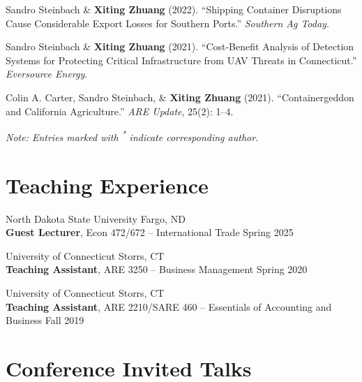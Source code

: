 \documentclass[10.5pt,letterpaper]{article}
\renewenvironment{itemize}{
	\begin{list}{}{
			\setlength{\leftmargin}{1.5em}
		}
	}{
	\end{list}
}
\begin{document}
\begin{itemize}
		\item[-] Sandro Steinbach \& \textbf{Xiting Zhuang} (2022).  
		``Shipping Container Disruptions Cause Considerable Export Losses for Southern Ports.''  
		\textit{Southern Ag Today}.
		
		\item[-] Sandro Steinbach \& \textbf{Xiting Zhuang} (2021).  
		``Cost-Benefit Analysis of Detection Systems for Protecting Critical Infrastructure from UAV Threats in Connecticut.''  
		\textit{Eversource Energy}.
		
		\item[-] Colin A. Carter, Sandro Steinbach, \& \textbf{Xiting Zhuang} (2021).  
		``Containergeddon and California Agriculture.''  
		\textit{ARE Update}, 25(2): 1–4.
	\end{itemize}
	\begin{footnotesize}
\textit{Note: Entries marked with \textsuperscript{*} indicate corresponding author.}

	\end{footnotesize}
	\section*{\textbf{Teaching Experience}}
	\begin{itemize}
		\item[-] North Dakota State University \hfill Fargo, ND \\
		\textbf{Guest Lecturer}, Econ 472/672 – International Trade \hfill Spring 2025
		
		\item[-] University of Connecticut \hfill Storrs, CT \\
		\textbf{Teaching Assistant}, ARE 3250 – Business Management \hfill Spring 2020
		
		\item[-] University of Connecticut \hfill Storrs, CT \\
		\textbf{Teaching Assistant}, ARE 2210/SARE 460 – Essentials of Accounting and Business \hfill Fall 2019
	\end{itemize}
	
\section*{\textbf{Conference Invited Talks}}
 
\end{document}
